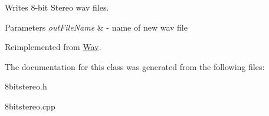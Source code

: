 Writes 8-\/bit Stereo wav files.


\begin{DoxyParams}{Parameters}
{\em out\+File\+Name} & -\/ name of new wav file \\
\hline
\end{DoxyParams}


Reimplemented from \hyperlink{classWav_a7bae34f37288c53cb113e76045f78098}{Wav}.



The documentation for this class was generated from the following files\+:\begin{DoxyCompactItemize}
\item 
8bitstereo.\+h\item 
8bitstereo.\+cpp\end{DoxyCompactItemize}
